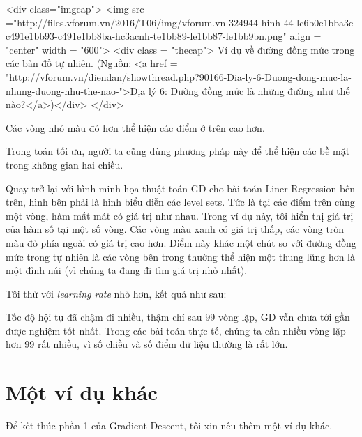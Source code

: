 <div class="imgcap"> 
 <img src ="http://files.vforum.vn/2016/T06/img/vforum.vn-324944-hinh-44-lc6b0e1bba3c-c491e1bb93-c491e1bb8ba-hc3acnh-te1bb89-le1bb87-le1bb9bn.png" align = "center" width = "600"> 
 <div class = "thecap"> Ví dụ về đường đồng mức trong các bản đồ tự nhiên. (Nguồn: <a href = "http://vforum.vn/diendan/showthread.php?90166-Dia-ly-6-Duong-dong-muc-la-nhung-duong-nhu-the-nao-">Địa lý 6: Đường đồng mức là những đường như thế nào?</a>)</div> 
</div> 
 
 
Các vòng nhỏ màu đỏ hơn thể hiện các điểm ở trên cao hơn.  
 
Trong toán tối ưu, người ta cũng dùng phương pháp này để thể hiện các bề mặt trong không gian hai chiều.  
 
Quay trở lại với hình minh họa thuật toán GD cho bài toán Liner Regression bên trên, hình bên phải là hình biểu diễn các level sets. Tức là tại các điểm trên cùng một vòng, hàm mất mát có giá trị như nhau. Trong ví dụ này, tôi hiển thị giá trị của hàm số tại một số vòng. Các vòng màu xanh có giá trị thấp, các vòng tròn màu đỏ phía ngoài có giá trị cao hơn. Điểm này khác một chút so với đường đồng mức trong tự nhiên là các vòng bên trong thường thể hiện một thung lũng hơn là một đỉnh núi (vì chúng ta đang đi tìm giá trị nhỏ nhất). 
 
Tôi thử với \textit{learning rate} nhỏ hơn, kết quả như sau: 
 
 
Tốc độ hội tụ đã chậm đi nhiều, thậm chí sau 99 vòng lặp, GD vẫn chưa tới gần được nghiệm tốt nhất. Trong các bài toán thực tế, chúng ta cần nhiều vòng lặp hơn 99 rất nhiều, vì số chiều và số điểm dữ liệu thường là rất lớn. 
 
 
\section{Một ví dụ khác}
 
Để kết thúc phần 1 của Gradient Descent, tôi xin nêu thêm một ví dụ khác. 
 
 
